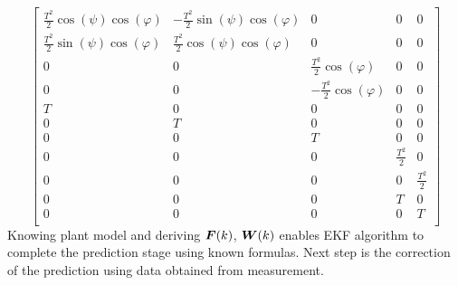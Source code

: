 $$ 
\begin{bmatrix}
\frac{T^{2}}{2}\cos(\psi)\cos(\varphi) & -\frac{T^{2}}{2}\sin(\psi)\cos(\varphi) & 0 & 0 & 0 \\
\frac{T^{2}}{2}\sin(\psi)\cos(\varphi) &  \frac{T^{2}}{2}\cos(\psi)\cos(\varphi) & 0 & 0 & 0 \\
0 & 0 & \frac{T^{2}}{2}\cos(\varphi) & 0 & 0 \\
0 & 0 & -\frac{T^{2}}{2}\cos(\varphi) & 0 & 0 \\
T & 0 & 0 & 0 & 0 \\
0 & T & 0 & 0 & 0 \\
0 & 0 & T & 0 & 0 \\
0 & 0 & 0 & \frac{T^{2}}{2} & 0 \\
0 & 0 & 0 & 0 & \frac{T^{2}}{2} \\
0 & 0 & 0 & T & 0 \\
0 & 0 & 0 & 0 & T \\
\end{bmatrix}
$$
Knowing plant model and deriving $\boldsymbol{F}(k)$, $\boldsymbol{W}(k)$ enables EKF algorithm to complete the prediction stage using known formulas. Next step is the correction of the prediction using data obtained from measurement.
